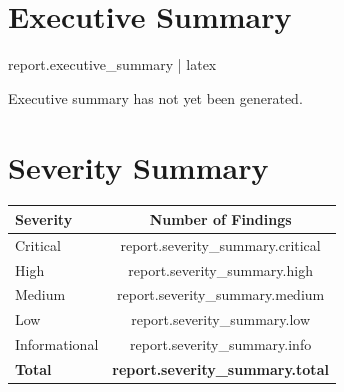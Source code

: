 \documentclass[11pt,a4paper]{article}
\begin{document}

\section{Executive Summary}

{%

{{ report.executive_summary | latex }}

{%

Executive summary has not yet been generated.

{%



\section{Severity Summary}

\begin{table}[h]
    \centering

    \begin{tabular}{lc}

        \toprule

        \textbf{Severity}
        &
        \textbf{Number of Findings}
        \\

        \midrule

        Critical
        &
        {{ report.severity_summary.critical }}
        \\

        High
        &
        {{ report.severity_summary.high }}
        \\

        Medium
        &
        {{ report.severity_summary.medium }}
        \\

        Low
        &
        {{ report.severity_summary.low }}
        \\

        Informational
        &
        {{ report.severity_summary.info }}
        \\

        \midrule

        \textbf{Total}
        &
        \textbf{ {{ report.severity_summary.total }} }
        \\


\end{tabular}
\end{table}}}}
\end{document}
